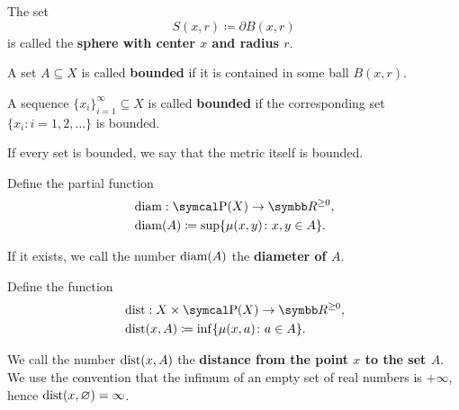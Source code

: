\begin{definition}
\begin{defenum}
     The set
    \begin{equation*}
      S(x, r) \coloneqq \partial{B(x, r)}
    \end{equation*}
    is called the \textbf{sphere with center \( x \) and radius \( r \)}.

     A set \( A \subseteq X \) is called \textbf{bounded} if it is contained in some ball \( B(x, r) \).

     A sequence \( \{ x_i \}_{i=1}^\infty \subseteq X \) is called \textbf{bounded} if the corresponding set \( \{ x_i \colon i = 1, 2, \ldots \} \) is bounded.

     If every set is bounded, we say that the metric itself is bounded.

     Define the partial function
    \begin{align*}
      &\Diam: \Power(X) \to \R^{\geq 0}, \\
      &\Diam(A) \coloneqq \sup \{ \mu(x, y) \colon x, y \in A \}.
    \end{align*}

    If it exists, we call the number \( \operatorname{diam}(A) \) the \textbf{diameter of \( A \)}.

     Define the function
    \begin{align*}
      &\Dist: X \times \Power(X) \to \R^{\geq 0}, \\
      &\Dist(x, A) \coloneqq \inf \{ \mu(x, a) \colon a \in A \}.
    \end{align*}

    We call the number \( \operatorname{dist}(x, A) \) the \textbf{distance from the point \( x \) to the set \( A \)}. We use the convention that the infimum of an empty set of real numbers is \( +\infty \), hence \( \operatorname{dist}(x, \varnothing) = \infty \).
  \end{defenum}
\end{definition}

